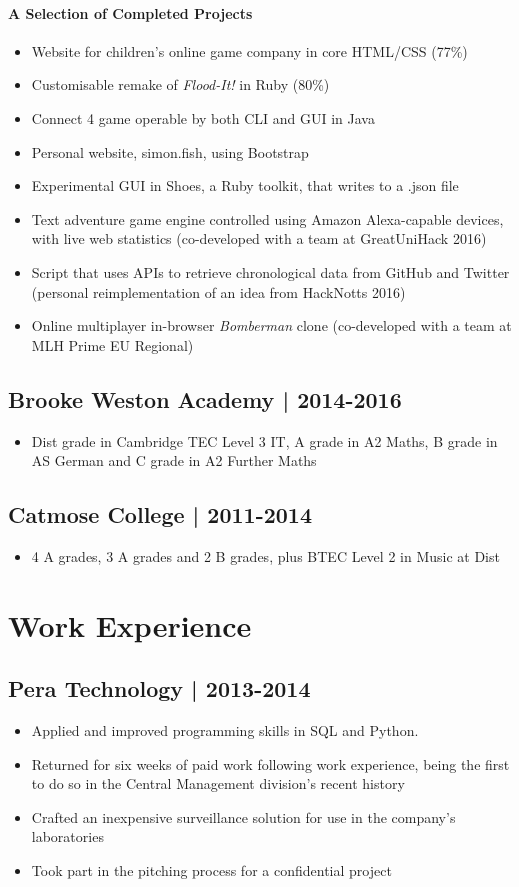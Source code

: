 \documentclass{article}
\begin{document}
\paragraph{A Selection of Completed Projects}
\begin{itemize}
  \item Website for children's online game company in core HTML/CSS (77\%) 
  \item Customisable remake of \textit{Flood-It!} in Ruby (80\%) 
  \item Connect 4 game operable by both CLI and GUI in Java
  \item Personal website, simon.fish, using Bootstrap
  \item Experimental GUI in Shoes, a Ruby toolkit, that writes to a .json file
  \item Text adventure game engine controlled using Amazon Alexa-capable devices, with live web statistics (co-developed with a team at GreatUniHack 2016)
  \item Script that uses APIs to retrieve chronological data from GitHub and Twitter (personal reimplementation of an idea from HackNotts 2016)
  \item Online multiplayer in-browser \textit{Bomberman} clone (co-developed with a team at MLH Prime EU Regional)
\end{itemize}
\subsection*{Brooke Weston Academy | 2014-2016}
\begin{itemize}
	\item Dist\* grade in Cambridge TEC Level 3 IT, A grade in A2 Maths, B grade in AS German and C grade in A2 Further Maths
\end{itemize}
\subsection*{Catmose College | 2011-2014}
\begin{itemize}
	\item 4 A\* grades, 3 A grades and 2 B grades, plus BTEC Level 2 in Music at Dist\* 
\end{itemize}
\section*{Work Experience}
\subsection*{Pera Technology | 2013-2014}
\begin{itemize}
\item Applied and improved programming skills in SQL and Python.
\item Returned for six weeks of paid work following work experience, being the first to do so in the Central Management division's recent history
\item Crafted an inexpensive surveillance solution for use in the company's laboratories
\item Took part in the pitching process for a confidential project
\end{itemize}
\end{document}

